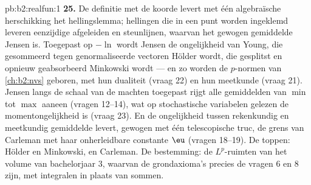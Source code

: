 \begin{solution}{pb:b2:realfun:1}
\textbf{25.} De definitie met de koorde levert met één
algebraïsche herschikking het hellingslemma; hellingen die in een
punt worden ingeklemd leveren eenzijdige afgeleiden en steunlijnen,
waarvan het gewogen gemiddelde Jensen is. Toegepast op $-\ln$ wordt
Jensen de ongelijkheid van Young, die gesommeerd tegen
genormaliseerde vectoren Hölder wordt, die gesplitst en opnieuw
geabsorbeerd Minkowski wordt --- en zo worden de $p$-normen van
\cref{ch:b2:nvs} geboren, met hun dualiteit (vraag 22) en hun
meetkunde (vraag 21). Jensen langs de schaal van de machten
toegepast rijgt alle gemiddelden van $\min$ tot $\max$ aaneen
(vragen 12--14), wat op stochastische variabelen gelezen de
momentongelijkheid is (vraag 23). En de ongelijkheid tussen
rekenkundig en meetkundig gemiddelde levert, gewogen met één
telescopische truc, de grens van Carleman met haar
onherleidbare constante $\eu$ (vragen 18--19). De toppen: Hölder en
Minkowski, en Carleman. De bestemming: de $L^p$-ruimten van het
volume van bachelorjaar 3, waarvan de grondaxioma's precies de
vragen 6 en 8 zijn, met integralen in plaats van sommen.
\end{solution}
